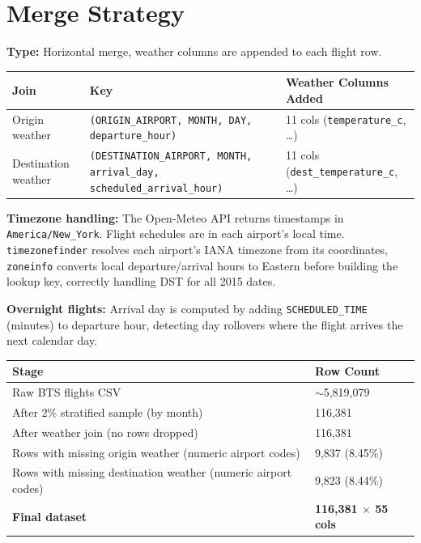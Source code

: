 \documentclass{article}
\newcommand{\code}[1]{\texttt{\small #1}}
\begin{document}
\newpage
\section{\textcolor{accentblue}{Merge Strategy}}

\textbf{Type:} Horizontal merge, weather columns are appended to each flight row.

\vspace{0.3em}
\begin{tcolorbox}[mainbox, title={Join Keys}]
\renewcommand{\arraystretch}{1.4}
\begin{tabularx}{\textwidth}{L{3cm} X L{4.5cm}}
    \toprule
    \textbf{Join} & \textbf{Key} & \textbf{Weather Columns Added} \\
    \midrule
    Origin weather      & \code{(ORIGIN\_AIRPORT, MONTH, DAY, departure\_hour)}                    & 11 cols (\code{temperature\_c}, \ldots) \\
    Destination weather & \code{(DESTINATION\_AIRPORT, MONTH, arrival\_day, scheduled\_arrival\_hour)} & 11 cols (\code{dest\_temperature\_c}, \ldots) \\
    \bottomrule
\end{tabularx}
\end{tcolorbox}

\textbf{Timezone handling:} The Open-Meteo API returns timestamps in \code{America/New\_York}. Flight schedules are in each airport's local time. \code{timezonefinder} resolves each airport's IANA timezone from its coordinates, \code{zoneinfo} converts local departure/arrival hours to Eastern before building the lookup key, correctly handling DST for all 2015 dates.

\textbf{Overnight flights:} Arrival day is computed by adding \code{SCHEDULED\_TIME} (minutes) to departure hour, detecting day rollovers where the flight arrives the next calendar day.

\vspace{0.3em}
\begin{tcolorbox}[mainbox, title={Row Counts Before/After Merging}]
\renewcommand{\arraystretch}{1.4}
\begin{tabularx}{\textwidth}{X R{3.5cm}}
    \toprule
    \textbf{Stage} & \textbf{Row Count} \\
    \midrule
    Raw BTS flights CSV                                           & $\sim$5,819,079 \\
    After 2\% stratified sample (by month)                        & 116,381 \\
    After weather join (no rows dropped)                          & 116,381 \\
    Rows with missing origin weather (numeric airport codes)       & 9,837 \enspace(8.45\%) \\
    Rows with missing destination weather (numeric airport codes)  & 9,823 \enspace(8.44\%) \\
    \textbf{Final dataset}                                        & \textbf{116,381 $\times$ 55 cols} \\
    \bottomrule
\end{tabularx}
\end{tcolorbox}
\end{document}
